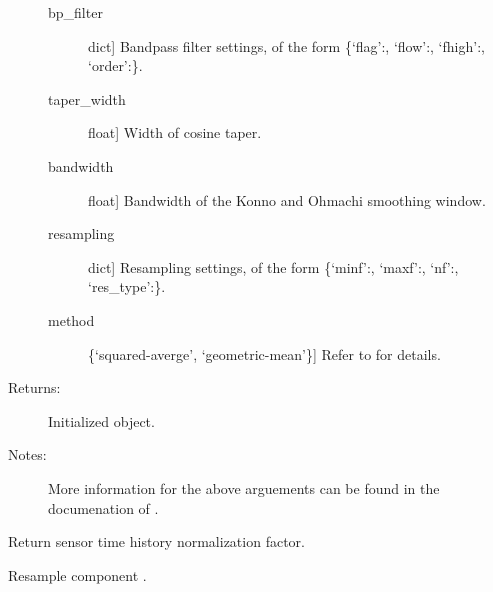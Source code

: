 \documentclass[letterpaper,10pt,english,openany,oneside]{sphinxmanual}
\begin{document}
\begin{fulllineitems}
\begin{fulllineitems}
\begin{description}
\begin{description}
\item[{bp\_filter}] \leavevmode{[}dict{]}
Bandpass filter settings, of the form 
\{‘flag’:, ‘flow’:, ‘fhigh’:,
‘order’:\}.

\item[{taper\_width}] \leavevmode{[}float{]}
Width of cosine taper.

\item[{bandwidth}] \leavevmode{[}float{]}
Bandwidth of the Konno and Ohmachi smoothing window.

\item[{resampling}] \leavevmode{[}dict{]}
Resampling settings, of the form 
\{‘minf’:, ‘maxf’:, ‘nf’:, 
‘res\_type’:\}.

\item[{method}] \leavevmode{[}\{‘squared-averge’, ‘geometric-mean’\}{]}
Refer to {\hyperref[\detokenize{index:hvsrpy.Sensor3c.combine_horizontals}]{}} for details.

\end{description}

\item[{Returns:}] \leavevmode
Initialized  object.

\item[{Notes:}] \leavevmode
More information for the above arguements can be found in
the documenation of .

\end{description}

\end{fulllineitems}


\begin{fulllineitems}
\label{\detokenize{index:hvsrpy.Sensor3c.normalization_factor}}
Return sensor time history normalization factor.

\end{fulllineitems}


\begin{fulllineitems}
\label{\detokenize{index:hvsrpy.Sensor3c.resample}}
Resample component .


\end{fulllineitems}
\end{fulllineitems}
\end{document}
